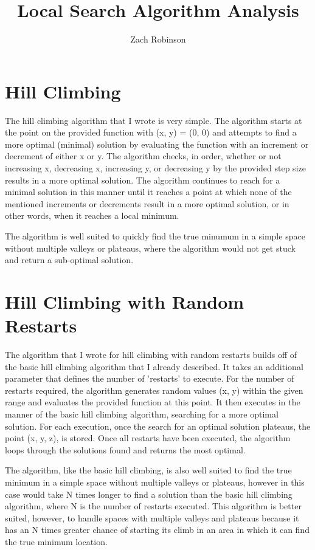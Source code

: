 \documentclass[11pt]{article} %
\title{Local Search Algorithm Analysis}
\author{Zach Robinson}
\begin{document}
\maketitle

\section{Hill Climbing}

The hill climbing algorithm that I wrote is very simple. The algorithm starts at the point on the provided function with (x, y) = (0, 0) and attempts to find a more optimal (minimal) solution by evaluating the function with an increment or decrement of either x or y. The algorithm checks, in order, whether or not increasing x, decreasing x, increasing y, or decreasing y by the provided step size results in a more optimal solution. The algorithm continues to reach for a minimal solution in this manner until it reaches a point at which none of the mentioned increments or decrements result in a more optimal solution, or in other words, when it reaches a local minimum.

The algorithm is well suited to quickly find the true minumum in a simple space without multiple valleys or plateaus, where the algorithm would not get stuck and return a sub-optimal solution.

\section{Hill Climbing with Random Restarts}

The algorithm that I wrote for hill climbing with random restarts builds off of the basic hill climbing algorithm that I already described. It takes an additional parameter that defines the number of 'restarts' to execute. For the number of restarts required, the algorithm generates random values (x, y) within the given range and evaluates the provided function at this point. It then executes in the manner of the basic hill climbing algorithm, searching for a more optimal solution. For each execution, once the search for an optimal solution plateaus, the point (x, y, z), is stored. Once all restarts have been executed, the algorithm loops through the solutions found and returns the most optimal.

The algorithm, like the basic hill climbing, is also well suited to find the true minimum in a simple space without multiple valleys or plateaus, however in this case would take N times longer to find a solution than the basic hill climbing algorithm, where N is the number of restarts executed. This algorithm is better suited, however, to handle spaces with multiple valleys and plateaus because it has an N times greater chance of starting its climb in an area in which it can find the true minimum location.
\end{document}
